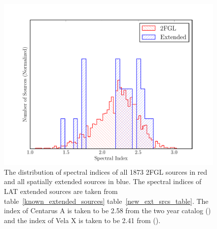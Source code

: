 \documentclass[12pt,preprint]{aastex}
\begin{document}
\clearpage
\begin{figure}
  \begin{center}
    \includegraphics{summary_plots/compare_index_2FGL.pdf}
    \end{center}
    \caption{
    The distribution of spectral indices of all 1873 2FGL sources in
    red and all spatially extended sources in blue. The
    spectral indices of LAT extended sources are taken from
    table~\ref{known_extended_sources} table~\ref{new_ext_srcs_table}.
    The index of Centarus A is taken to be 2.58 from the two year catalog
    (\cite{second_cat}) and the index of Vela X is taken to be 2.41
    from (\cite{velax}). }\label{compare_index_2FGL}
  \end{figure}
\end{document}
